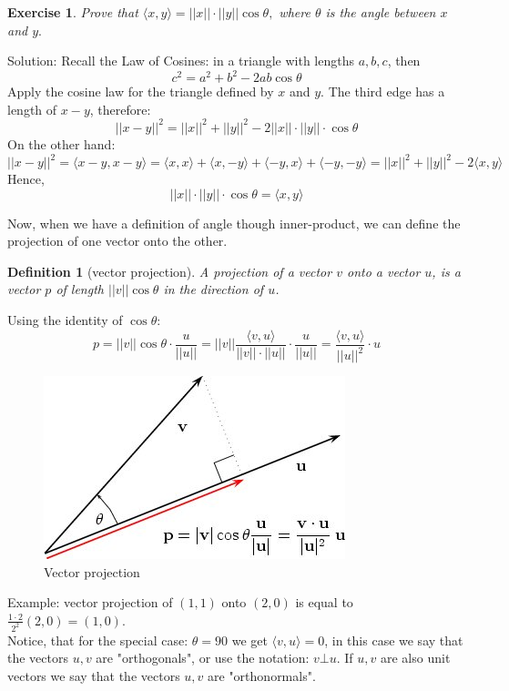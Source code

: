 \documentclass[11pt, oneside]{article}   	%
\newtheorem{definition}[lemma]{Definition}
\newtheorem{exercise}{Exercise}
\begin{document}
\begin{exercise} Prove that  $\langle x,y\rangle=||x||\cdot||y||\cos\theta,$ where $\theta$ is the angle between $x$ and $y.$ \end{exercise}

Solution: Recall the Law of Cosines:  in a triangle with lengths $a,b,c$, then  $$c^2=a^2+b^2-2ab\cos\theta$$
Apply the cosine law for the triangle defined by $x$ and $y$. The third edge has a length of $x-y$, therefore:
$$ ||x-y||^2=||x||^2+||y||^2-2||x||\cdot||y||\cdot \cos \theta$$
On the other hand:
 $$ ||x-y||^2=\langle x-y,x-y\rangle=\langle x,x\rangle+\langle x,-y\rangle+\langle -y,x\rangle+\langle -y,-y\rangle=||x||^2+||y||^2-2\langle x,y\rangle$$
 Hence, $$||x||\cdot||y||\cdot \cos \theta = \langle x,y\rangle$$
 
Now, when we have a definition of angle though inner-product, we can define the projection of one vector onto the other.
\begin{definition}[vector projection]
A projection of a vector $v$ onto a vector $u$, is a vector $p$ of length $||v|| \cos \theta$ in the direction of $u$.
\end{definition}
Using the identity of $\cos\theta$:$$p=||v||\cos\theta\cdot \frac{u}{||u||}=||v||\frac{ \langle v,u\rangle}{||v||\cdot||u||}\cdot \frac{u}{||u||}=\frac{ \langle v,u\rangle }{||u||^2}\cdot u$$
\begin{figure}[h!]
  \centering
    \includegraphics[scale=0.6]{v102x.jpg}  
   \caption{Vector projection}
\end{figure}
Example: vector projection of $(1,1)$ onto $(2,0)$ is equal to $\frac{1\cdot 2}{2^2}(2,0)=(1,0).$ \\
 
Notice, that for the special case: $\theta=90$ we get $\langle v,u\rangle=0$, in this case we say that the vectors $u,v$ are "orthogonals", or use the notation: $v\bot u$. If $u,v$ are also unit vectors we say that the vectors $u,v$ are "orthonormals".
\end{document}
